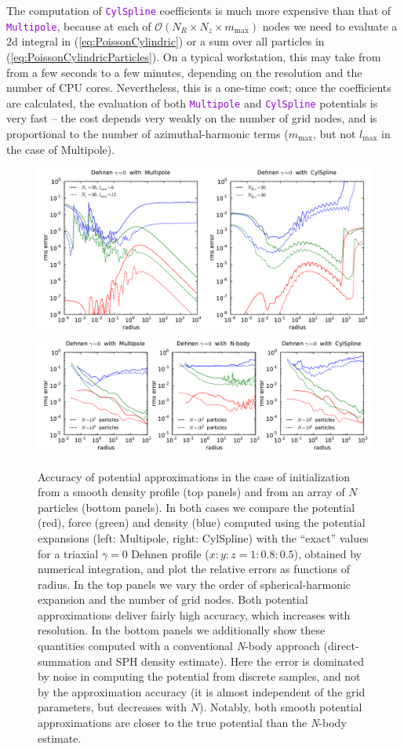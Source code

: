 \documentclass[12pt]{article}
\newcommand{\Nbody}{\textsl{N}-body\xspace}
\newcommand{\ttt}[1]{\textcolor{darkviolet}{\texttt{#1}}}
\begin{document}
The computation of \ttt{CylSpline} coefficients is much more expensive than that of \ttt{Multipole}, because at each of $\mathcal{O}(N_R\times N_z \times m_\mathrm{max})$ nodes we need to evaluate a 2d integral in (\ref{eq:PoissonCylindric}) or a sum over all particles in (\ref{eq:PoissonCylindricParticles}). On a typical workstation, this may take from from a few seconds to a few minutes, depending on the resolution and the number of CPU cores. Nevertheless, this is a one-time cost; once the coefficients are calculated, the evaluation of both \ttt{Multipole} and \ttt{CylSpline} potentials is very fast -- the cost depends very weakly on the number of grid nodes, and is proportional to the number of azimuthal-harmonic terms ($m_\mathrm{max}$, but not $l_\mathrm{max}$ in the case of Multipole).

\begin{figure}
\includegraphics[width=16cm]{D0.pdf}
\includegraphics[width=16cm]{D0nb.pdf}
\caption{Accuracy of potential approximations in the case of initialization from a smooth density profile (top panels) and from an array of $N$ particles (bottom panels). In both cases we compare the potential (red), force (green) and density (blue) computed using the potential expansions (left: Multipole, right: CylSpline) with the ``exact'' values for a triaxial $\gamma=0$ Dehnen profile ($x:y:z=1:0.8:0.5$), obtained by numerical integration, and plot the relative errors as functions of radius. In the top panels we vary the order of spherical-harmonic expansion and the number of grid nodes. Both potential approximations deliver fairly high accuracy, which increases with resolution. In the bottom panels we additionally show these quantities computed with a conventional \Nbody approach (direct-summation and SPH density estimate). Here the error is dominated by noise in computing the potential from discrete samples, and not by the approximation accuracy (it is almost independent of the grid parameters, but decreases with $N$). Notably, both smooth potential approximations are closer to the true potential than the \Nbody estimate.
}  \label{fig:PotentialAccuracy1}
\end{figure}
\end{document}
